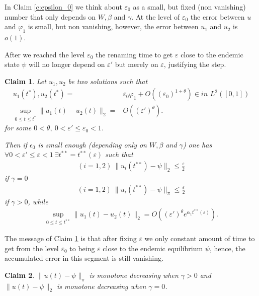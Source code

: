 \documentclass{article}
\newcommand{\1}[1]{{\mathds{1}}_{\left\{#1\right\}}}
\newtheorem{claim}{Claim}
\begin{document}
In Claim \ref{c:epsilon_0} we think about $\varepsilon_0$ as a small, but fixed (non vanishing) number that only depends on $W,\beta$ and $\gamma$. At the level of $\varepsilon_0$ the error between $u$ and $\varphi_1$ is small, but non vanishing, however, the error between $u_1$ and $u_2$ is $o(1)$.

After we reached the level $\varepsilon_0$ the renaming time to get $\varepsilon$ close to the endemic state $\psi$ will no longer depend on $\varepsilon'$ but merely on $\varepsilon$, justifying the step.

\begin{claim}
\label{c:epsilon_close}
Let $u_1,u_2$ be two solutions such that
\begin{align*}
	u_1(t^*),u_2(t^*)=&\varepsilon_0 \varphi_1+O \left((\varepsilon_0)^{1+\theta}\right) \in \textit{in } L^2([0,1]) \\
	\sup_{0 \leq t \leq t^*} \|u_1(t)-u_2(t) \|_2=&O \left((\varepsilon')^\theta \right).
\end{align*}
for some $0<\theta, \ 0<\varepsilon' \leq  \varepsilon_0 <1$.

Then if $\epsilon_0$ is small enough (depending only on $W,\beta$ and $\gamma$) one has $\forall 0<\varepsilon' \leq \varepsilon<1 \ \exists t^{**}=t^{**}(\varepsilon)$ such that
\begin{align}
\label{eq:epsilon_1}
(i=1,2) \ \|u_i(t^{**})-\psi \|_2 \leq \frac{\varepsilon}{2}
\end{align}
if $\gamma=0$
\begin{align}
	\label{eq:epsilon_1'}
	(i=1,2) \ \|u_i(t^{**})-\psi \|_\pi \leq \frac{\varepsilon}{2}
\end{align}
 if $\gamma>0$, while
\begin{align}
\label{eq:epsilon_2}
\sup_{0 \leq t \leq t^{**}} \|u_1(t)-u_2(t) \|_2=O \left((\varepsilon')^{\theta}e^{\alpha_1 t^{**}(\varepsilon)} \right).	
\end{align}
\end{claim}

The message of Claim \ref{c:epsilon_close} is that after fixing $\varepsilon$ we only constant amount of time to get from the level $\varepsilon_0$ to being $\varepsilon$ close to the endemic equilibrium $\psi$, hence, the accumulated error in this segment is still vanishing.

\begin{claim}
\label{c:monotonicity}
$\|u(t)-\psi  \|_\pi$ is monotone decreasing when $\gamma>0$ and $\|u(t)-\psi  \|_2$ is monotone decreasing when $\gamma=0$.
\end{claim}
\end{document}
